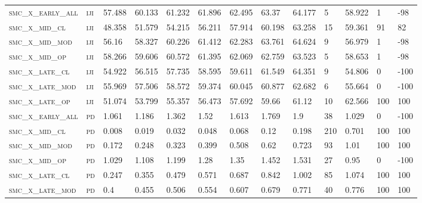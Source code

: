 \begin{landscape}
\begin{center}
\begin{footnotesize}
\begin{longtable}{lllllllllllll}
\textsc{smc\_x\_early\_all} & \textsc{iji       }   & 57.488   & 60.133   & 61.232   & 61.896   & 62.495   & 63.37    & 64.177   & 5   & 58.922   & 1   & -98    \\
\textsc{smc\_x\_mid\_cl   } & \textsc{iji       }   & 48.358   & 51.579   & 54.215   & 56.211   & 57.914   & 60.198   & 63.258   & 15  & 59.361   & 91  & 82     \\
\textsc{smc\_x\_mid\_mod  } & \textsc{iji       }   & 56.16    & 58.327   & 60.226   & 61.412   & 62.283   & 63.761   & 64.624   & 9   & 56.979   & 1   & -98    \\
\textsc{smc\_x\_mid\_op   } & \textsc{iji       }   & 58.266   & 59.606   & 60.572   & 61.395   & 62.069   & 62.759   & 63.523   & 5   & 58.653   & 1   & -98    \\
\textsc{smc\_x\_late\_cl  } & \textsc{iji       }   & 54.922   & 56.515   & 57.735   & 58.595   & 59.611   & 61.549   & 64.351   & 9   & 54.806   & 0   & -100   \\
\textsc{smc\_x\_late\_mod } & \textsc{iji       }   & 55.969   & 57.506   & 58.572   & 59.374   & 60.045   & 60.877   & 62.682   & 6   & 55.664   & 0   & -100   \\
\textsc{smc\_x\_late\_op  } & \textsc{iji       }   & 51.074   & 53.799   & 55.357   & 56.473   & 57.692   & 59.66    & 61.12    & 10  & 62.566   & 100 & 100    \\
\textsc{smc\_x\_early\_all} & \textsc{pd        }   & 1.061    & 1.186    & 1.362    & 1.52     & 1.613    & 1.769    & 1.9      & 38  & 1.029    & 0   & -100   \\
\textsc{smc\_x\_mid\_cl   } & \textsc{pd        }   & 0.008    & 0.019    & 0.032    & 0.048    & 0.068    & 0.12     & 0.198    & 210 & 0.701    & 100 & 100    \\
\textsc{smc\_x\_mid\_mod  } & \textsc{pd        }   & 0.172    & 0.248    & 0.323    & 0.399    & 0.508    & 0.62     & 0.723    & 93  & 1.01     & 100 & 100    \\
\textsc{smc\_x\_mid\_op   } & \textsc{pd        }   & 1.029    & 1.108    & 1.199    & 1.28     & 1.35     & 1.452    & 1.531    & 27  & 0.95     & 0   & -100   \\
\textsc{smc\_x\_late\_cl  } & \textsc{pd        }   & 0.247    & 0.355    & 0.479    & 0.571    & 0.687    & 0.842    & 1.002    & 85  & 1.074    & 100 & 100    \\
\textsc{smc\_x\_late\_mod } & \textsc{pd        }   & 0.4      & 0.455    & 0.506    & 0.554    & 0.607    & 0.679    & 0.771    & 40  & 0.776    & 100 & 100    \\

\end{longtable}
\end{footnotesize}
\end{center}
\end{landscape}
